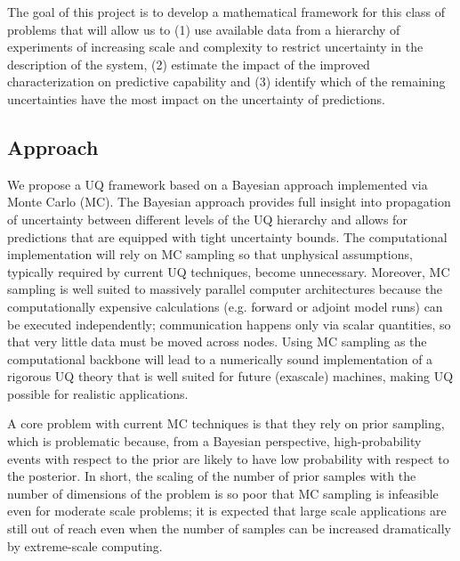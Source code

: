 \documentclass[11pt]{article}
\begin{document}
The goal of this project is to develop a
mathematical framework for this class of problems that will allow us to (1) use available data from a hierarchy
of experiments of increasing scale and complexity to restrict
uncertainty in the description of the system, (2) estimate the impact of the improved characterization
on predictive capability and (3) identify which of the remaining uncertainties have the most impact
on the uncertainty of predictions.

 


\subsection*{Approach}
We propose a UQ framework based on a Bayesian approach implemented via Monte Carlo (MC).
The Bayesian approach provides full insight into propagation of uncertainty between different levels of the UQ hierarchy
and allows for predictions that are equipped with tight uncertainty bounds.
The computational implementation will rely on MC sampling so that unphysical assumptions,
typically required by current UQ techniques, become unnecessary.
Moreover, MC sampling is well suited to massively parallel computer architectures because the computationally expensive calculations
(e.g. forward or adjoint model runs) can be executed independently; communication happens only via scalar quantities,
so that very little data must be moved across nodes.
Using MC sampling as the computational backbone will lead to a numerically sound implementation of a rigorous UQ theory
that is well suited for future (exascale) machines, making UQ possible for realistic applications.

A core problem with current MC techniques is that they rely on prior sampling, which is problematic because,
from a Bayesian perspective, high-probability events with respect to the prior are likely to have low
probability with respect to the posterior. In short, the scaling of the number of prior samples with the number
of dimensions of the problem is so poor that MC sampling is infeasible even for moderate scale problems;
it is expected that large scale applications are still out of reach even when the number of samples can be
increased dramatically by extreme-scale computing.
\end{document}
